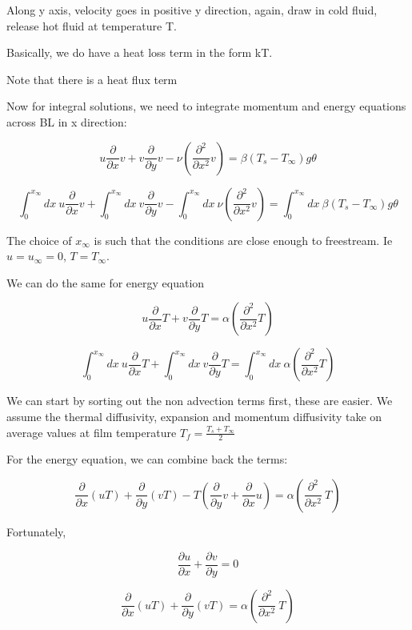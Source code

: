 \documentclass[11pt]{article}
\begin{document}
Along y axis, velocity goes in positive y direction, again, draw in cold fluid, release hot fluid at temperature T.

Basically, we do have a heat loss term in the form kT. 

Note that there is a heat flux term 

Now for integral solutions, we need to integrate momentum and energy equations across BL in x direction:

$$ u \frac{\partial}{\partial x} v +  v \frac{\partial}{\partial y} v  -\nu ( \frac{\partial^2}{\partial x^2} v ) = \beta(T_s-T_\infty) g \theta $$

$$ \int_0^{x_\infty}  dx\ u \frac{\partial}{\partial x} v  + \int_0^{x_\infty}  dx \  v \frac{\partial}{\partial y} v  - \int_0^{x_\infty}  dx \ \nu ( \frac{\partial^2}{\partial x^2} v ) =  \int_0^{x_\infty}  dx \ \beta(T_s-T_\infty) g \theta $$

The choice of $x_\infty$ is such that the conditions are close enough to freestream. Ie $u = u_\infty = 0 $, $T=T_\infty$.

We can do the same for energy equation

$$ u \frac{\partial}{\partial x} T + v  \frac{\partial }{\partial y}  T  = \alpha (  \frac{\partial^2}{\partial x^2} T ) $$ 

$$  \int_0^{x_\infty}  dx\ u \frac{\partial}{\partial x} T +  \int_0^{x_\infty}  dx\  v  \frac{\partial }{\partial y}  T  =  \int_0^{x_\infty}  dx\  \alpha (  \frac{\partial^2}{\partial x^2} T ) $$ 

We can start by sorting out the non advection terms first, these are easier. We assume the thermal diffusivity, expansion and momentum diffusivity take on average values at film temperature $T_f = \frac{T_s+T_\infty}{2}$



For the energy equation, we can combine back the terms:

$$ \frac{\partial}{\partial x}(uT)   + \frac{\partial}{\partial y}(vT) -T( \frac{\partial}{\partial y}v + \frac{\partial}{\partial x}u) = \alpha (\frac{\partial^2 }{\partial x^2} \ T ) $$ 

Fortunately,

$$\frac{\partial u}{\partial x} + \frac{\partial v}{\partial y}= 0$$

$$ \frac{\partial}{\partial x}(uT)   + \frac{\partial}{\partial y}(vT)  = \alpha (\frac{\partial^2 }{\partial x^2} \ T ) $$ 
\end{document}
